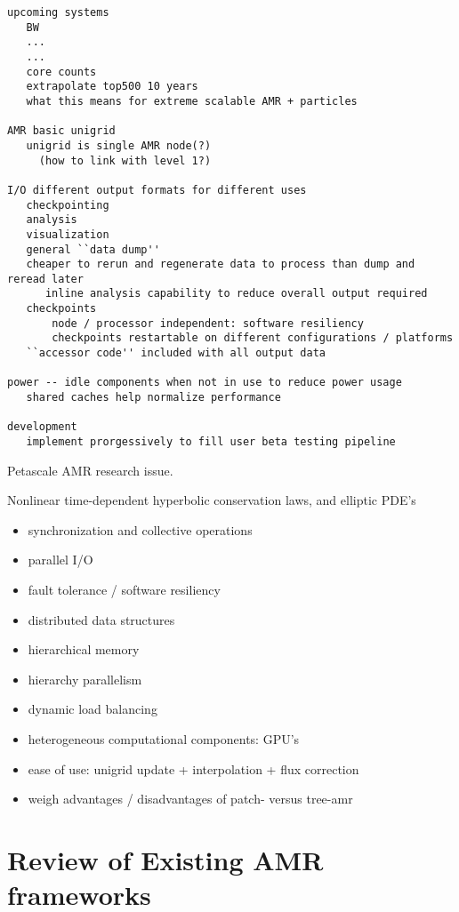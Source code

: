 \documentclass[14pt]{article}
\begin{document}
\begin{verbatim}
upcoming systems
   BW
   ...
   ...
   core counts
   extrapolate top500 10 years
   what this means for extreme scalable AMR + particles

AMR basic unigrid
   unigrid is single AMR node(?)
     (how to link with level 1?)

I/O different output formats for different uses
   checkpointing
   analysis
   visualization
   general ``data dump''
   cheaper to rerun and regenerate data to process than dump and reread later
      inline analysis capability to reduce overall output required
   checkpoints
       node / processor independent: software resiliency
       checkpoints restartable on different configurations / platforms
   ``accessor code'' included with all output data

power -- idle components when not in use to reduce power usage
   shared caches help normalize performance

development
   implement prorgessively to fill user beta testing pipeline

\end{verbatim}

Petascale AMR research issue.


Nonlinear time-dependent hyperbolic conservation laws, and elliptic PDE's

\begin{itemize}
\item synchronization and collective operations
\item parallel I/O
\item fault tolerance / software resiliency
\item distributed data structures
\item hierarchical memory
\item hierarchy parallelism
\item dynamic load balancing
\item heterogeneous computational components: GPU's
\item ease of use: unigrid update + interpolation + flux correction
\item weigh advantages / disadvantages of patch- versus tree-amr
\end{itemize}


\section{Review of Existing AMR frameworks}

\end{document}
